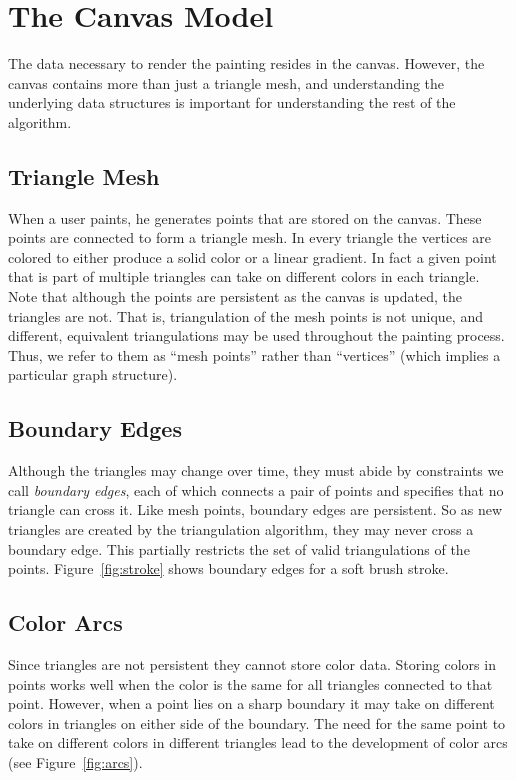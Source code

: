 \documentclass[review]{acmsiggraph}
\begin{document}
\section{The Canvas Model}
The data necessary to render the painting resides in the canvas. However, the canvas contains more than just
a triangle mesh, and understanding the underlying data structures is important for 
understanding the rest of the algorithm.

\subsection{Triangle Mesh}
When a user paints, he generates points that are stored on the canvas. These points are
connected to form a triangle mesh. In every triangle the vertices are colored to either
produce a solid color or a linear gradient. In fact a given point that is part of
multiple triangles can take on different colors in each triangle. Note that although
the points are persistent as the canvas is updated, the triangles are not.  
That is, triangulation of the mesh points is not unique, and different, equivalent triangulations may 
be used throughout the painting process.
Thus, we refer to them as ``mesh points'' rather than ``vertices'' (which implies a particular graph
structure).

\subsection{Boundary Edges}
Although the triangles may change over time, they must abide by constraints we call
\emph{boundary edges}, each of which connects a pair of points and specifies that no triangle
can cross it. Like mesh points, boundary edges are persistent. 
%
So as new triangles are created by the triangulation algorithm, they
may never cross a boundary edge.  
This partially restricts the set of valid triangulations of the points.  Figure~\ref{fig:stroke} shows boundary edges for a soft brush stroke.

\subsection{Color Arcs}
Since triangles are not persistent they cannot store color data.
Storing colors in points works well when the color is the same for all triangles connected
to that point. However, when a point lies on a sharp boundary it may take on different colors in
triangles on either side of the boundary. The need for the same point to take on different
colors in different triangles lead to the development of color arcs (see Figure~\ref{fig:arcs}).
\end{document}
